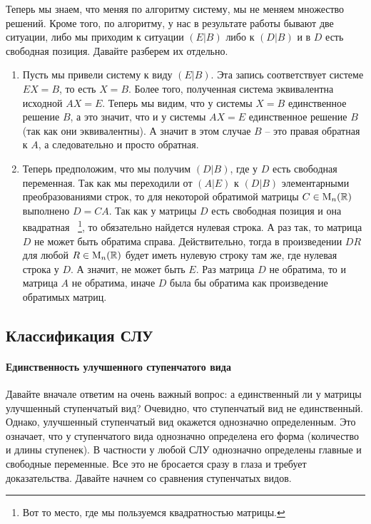 Теперь мы знаем, что меняя по алгоритму систему, мы не меняем множество решений.
Кроме того, по алгоритму, у нас в результате работы бывают две ситуации, либо мы приходим к ситуации $(E|B)$ либо к $(D|B)$ и в $D$ есть свободная позиция.
Давайте разберем их отдельно.
\begin{enumerate}
\item Пусть мы привели систему к виду $(E|B)$.
Эта запись соответствует системе $E X = B$, то есть $X = B$.
Более того, полученная система эквивалентна исходной $AX = E$.
Теперь мы видим, что у системы $X = B$ единственное решение $B$, а это значит, что и у системы $AX = E$ единственное решение $B$ (так как они эквивалентны).
А значит в этом случае $B$ -- это правая обратная к $A$, а следовательно и просто обратная.

\item Теперь предположим, что мы получим $(D|B)$, где у $D$ есть свободная переменная.
Так как мы переходили от $(A|E)$ к $(D|B)$ элементарными преобразованиями строк, то для некоторой обратимой матрицы $C\in \operatorname{M}_{n}(\mathbb R)$ выполнено $D = CA$.
Так как у матрицы $D$ есть свободная позиция и она квадратная~%
\footnote{Вот то место, где мы пользуемся квадратностью матрицы.},
то обязательно найдется нулевая строка.
А раз так, то матрица $D$ не может быть обратима справа.
Действительно, тогда в произведении $D R$ для любой $R\in \operatorname{M}_{n}(\mathbb R)$ будет иметь нулевую строку там же, где нулевая строка у $D$.
А значит, не может быть $E$.
Раз матрица $D$ не обратима, то и матрица $A$ не обратима, иначе $D$ была бы обратима как произведение обратимых матриц.
\end{enumerate}

\subsection{Классификация СЛУ}

\paragraph{Единственность улучшенного ступенчатого вида}

Давайте вначале ответим на очень важный вопрос: а единственный ли у матрицы улучшенный ступенчатый вид?
Очевидно, что ступенчатый вид не единственный.
Однако, улучшенный ступенчатый вид окажется однозначно определенным.
Это означает, что у ступенчатого вида однозначно определена его форма (количество и длины ступенек).
В частности у любой СЛУ однозначно определены главные и свободные переменные.
Все это не бросается сразу в глаза и требует доказательства.
Давайте начнем со сравнения ступенчатых видов.

